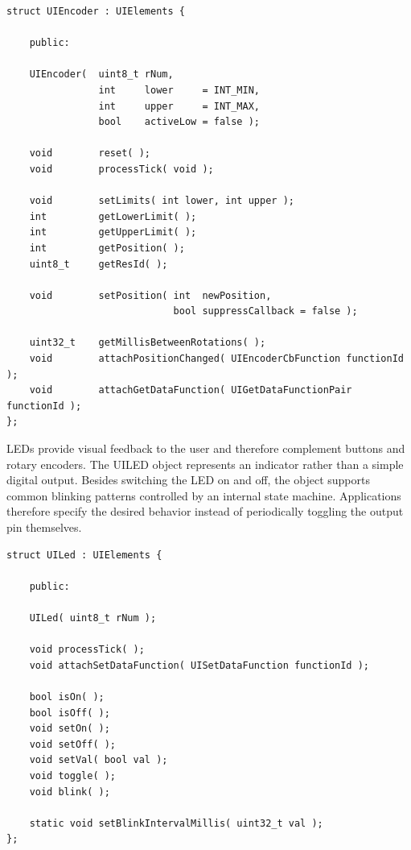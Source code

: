 \lstset{language=c++, style=codesnippetstyle, numbers=none}
\begin{lstlisting}
struct UIEncoder : UIElements {

    public:

    UIEncoder(  uint8_t rNum,
                int     lower     = INT_MIN, 
                int     upper     = INT_MAX, 
                bool    activeLow = false );

    void        reset( );
    void        processTick( void );

    void        setLimits( int lower, int upper );
    int         getLowerLimit( );
    int         getUpperLimit( );
    int         getPosition( );
    uint8_t     getResId( );

    void        setPosition( int  newPosition,
                             bool suppressCallback = false );
                                             
    uint32_t    getMillisBetweenRotations( );
    void        attachPositionChanged( UIEncoderCbFunction functionId );
    void        attachGetDataFunction( UIGetDataFunctionPair functionId );
};
\end{lstlisting}
\FloatBarrier


LEDs provide visual feedback to the user and therefore complement buttons and
rotary encoders. The UILED object represents an indicator rather than a simple
digital output.
Besides switching the LED on and off, the object supports common blinking
patterns controlled by an internal state machine. Applications therefore specify
the desired behavior instead of periodically toggling the output pin
themselves.

\lstset{language=c++, style=codesnippetstyle, numbers=none}
\begin{lstlisting}
struct UILed : UIElements {

    public:

    UILed( uint8_t rNum );

    void processTick( );
    void attachSetDataFunction( UISetDataFunction functionId );

    bool isOn( );
    bool isOff( );
    void setOn( );
    void setOff( );
    void setVal( bool val );
    void toggle( );
    void blink( );

    static void setBlinkIntervalMillis( uint32_t val );
};
\end{lstlisting}
\FloatBarrier

